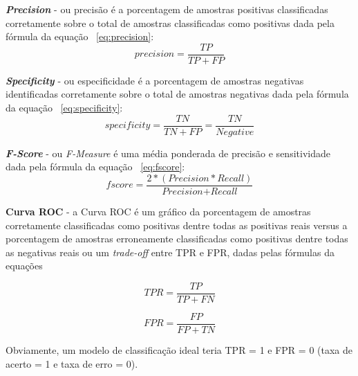 \textbf{\textit{Precision}} - ou precisão é a porcentagem de amostras positivas classificadas corretamente sobre o total de amostras classificadas como positivas dada pela fórmula da equação ~\ref{eq:precision}:
\begin{equation} \label{eq:precision}
    precision = \frac{TP}{TP+FP}
\end{equation}

\textbf{\textit{Specificity}} - ou especificidade é a porcentagem de amostras negativas identificadas corretamente sobre o total de amostras negativas dada pela fórmula da equação ~\ref{eq:specificity}:
\begin{equation} \label{eq:specificity}
    specificity = \frac{TN}{TN+FP}=\frac{TN}{\textit{Negative}}
\end{equation}

\textbf{\textit{F-Score}} - ou \textit{F-Measure} é uma média ponderada de precisão e sensitividade dada pela fórmula da equação ~\ref{eq:fscore}:
\begin{equation} \label{eq:fscore}
    fscore=\frac{2*(\textit{Precision}*\textit{Recall})}{\textit{Precision}+\textit{Recall}}
\end{equation}

\textbf{Curva ROC} - a Curva ROC é um gráfico da porcentagem de amostras corretamente classificadas como positivas dentre todas as positivas reais versus a porcentagem de amostras erroneamente classificadas como positivas dentre todas as negativas reais ou um \textit{trade-off} entre TPR e FPR, dadas pelas fórmulas da equações  

\begin{equation} \label{eq:tpr}
    TPR=\frac{TP}{TP+FN}
\end{equation}

\begin{equation} \label{eq:fpr}
    FPR=\frac{FP}{FP+TN}
\end{equation}

Obviamente, um modelo de classificação ideal teria TPR = 1 e FPR = 0 (taxa de acerto = 1 e taxa de erro = 0).
